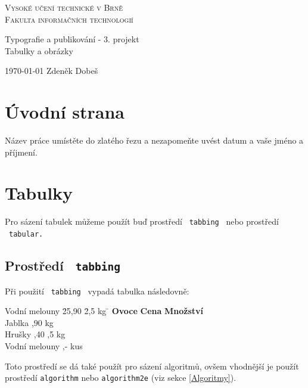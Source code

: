 \documentclass[11pt,a4paper]{article}
\begin{document}
\begin{titlepage}
    \begin{center}
        \textsc{\Huge Vysoké učení technické v Brně             
        \bigskip \\}
        \textsc{\huge Fakulta informačních technologií}
        
        {\LARGE Typografie a publikování - 3. projekt \\
            \vspace{0.3em}
        \Huge Tabulky a obrázky}
        
        {\Large \today \hfill 
        Zdeněk Dobeš}
    \end{center}
\end{titlepage}

\section{Úvodní strana}
Název práce umístěte do zlatého řezu a nezapomeňte uvést  datum a vaše jméno a příjmení.

\section{Tabulky}

Pro sázení tabulek můžeme použít buď prostředí \ \texttt{tabbing} \ nebo prostředí \ \texttt{tabular.}

\subsection{Prostředí \ \texttt{tabbing}}

Při použití \ \texttt{tabbing} \ vypadá tabulka následovně:

\begin{tabbing}
Vodní melouny \quad \= 25,90 \quad \= 2,5 kg \= \kill
\textbf{Ovoce} \> \textbf{Cena} \> \textbf{Množství} \\
Jablka ,90  kg \\
Hrušky ,40 ,5 kg \\
Vodní melouny ,-  kus \\
\end{tabbing}
Toto prostředí se dá také použít pro sázení algoritmů, ovšem vhodnější je použít prostředí \texttt{algorithm} nebo \linebreak \texttt{algorithm2e} (viz sekce \ref{Algoritmy}).
\end{document}

